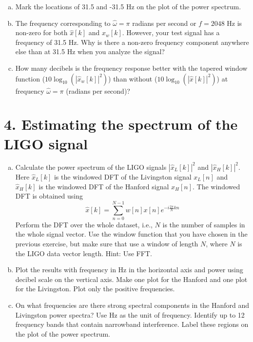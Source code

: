 \begin{enumerate}[a)]
  \item Mark the locations of 31.5 and -31.5 Hz on the plot of the power spectrum.


\item The frequency corresponding to $\hat{\omega}=\pi$ radians per
  second or $f=2048$ Hz is non-zero for both $\hat{x}[k]$ and $\hat{x}_w[k]$. However, your test signal has a frequency of 31.5 Hz. Why is there a non-zero frequency component anywhere else than at 31.5 Hz when you analyze the signal?

\item How many decibels is the frequency response better with the
  tapered window function ($10\log_{10}(|\hat{x}_w[k]|^2)$) than without
  ($10\log_{10}(|\hat{x}[k]|^2)$) at frequency $\hat{\omega}=\pi$ (radians per
  second)?

\end{enumerate}

\section{4. Estimating the spectrum of the LIGO signal}

\begin{enumerate}[a)]
\item Calculate the power spectrum of the LIGO signals
  $|\hat{x}_L[k]|^2$ and $|\hat{x}_H[k]|^2$. Here $\hat{x}_L[k]$ is the
  windowed DFT of the Livingston signal $x_L[n]$ and $\hat{x}_H[k]$ is
  the windowed DFT of the Hanford signal $x_H[n]$. The windowed DFT is
  obtained using
\begin{equation}
\hat{x}[k] = \sum_{n=0}^{N-1} w[n]x[n]e^{-i\frac{2\pi}{N}kn}
\label{dfteq}
\end{equation}
Perform the DFT over the whole dataset, i.e., $N$ is the number of samples in the whole signal vector. Use the window function that you have chosen in the previous exercise, but make sure that use a window of length $N$, where $N$ is the LIGO data vector length. Hint: Use FFT.

\item Plot the results with frequency in Hz in the horizontal axis and
  power using decibel scale on the vertical axis. Make one
  plot for the Hanford and one plot for the Livingston. Plot only the positive frequencies.

\item On what frequencies are there strong spectral components in the
  Hanford and Livingston power spectra? Use Hz as the unit of
  frequency. Identify up to 12 frequency bands that contain narrowband interference. Label these regions on the plot of the power spectrum.

\end{enumerate}


